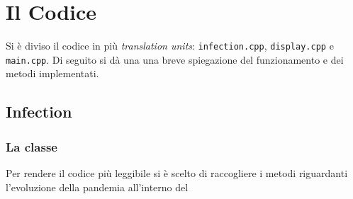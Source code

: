 \documentclass{article}
\begin{document}
\section{Il Codice}
\hspace{\parindent} Si è diviso il codice in più 
\textit{translation units}: \verb|infection.cpp|,
\verb|display.cpp| e \verb|main.cpp|. Di seguito si dà una una breve 
spiegazione del funzionamento e dei metodi implementati.
\subsection{Infection}
\subsubsection{La classe}
Per rendere il codice più leggibile si è scelto di raccogliere i metodi
riguardanti l'evoluzione della pandemia all'interno del 
\end{document}
